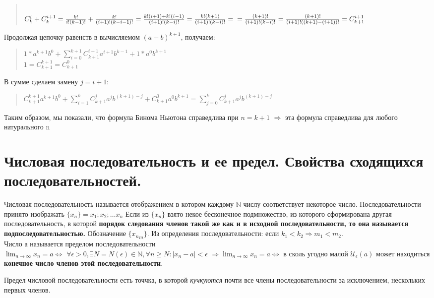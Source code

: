 \documentclass[oneside]{book}
\begin{document}
\begin{enumerate}
\begin{enumerate}
\begin{quote}
\\$C_k^i+C_k^{i+1}=\frac{k!}{i!(k-1)!}+\frac{k!}{(i+1)!(k-i-1)!}=\frac{k!(i+1)+k!(i-1)}{(i+1)!(k-i)!}=\frac{k!(k+1)}{(i+1)!(k-i)!}=\\=\frac{(k+1)!}{(i+1)!(k-i)!}=\frac{(k+1)!}{(i+1)!((k+1)-(i+1))!}=C_{k+1}^{i+1}$\end{quote}
Продолжая цепочку равенств в вычисляемом $(a+b)^{k+1}$, получаем:
\begin{quote}$1*a^{k+1}b^0+\sum\limits_{i=0}^{k+1}C_{k+1}^{i+1}a^{i+1}b^{k-1}+1*a^0b^{k+1}$\\
$1=C_{k+1}^{k+1}=C_{k+1}^0$\end{quote}
В сумме сделаем замену $j=i+1$:
\begin{quote}$C_{k+1}^{k+1}a^{k+1}b^0+\sum\limits_{i=1}^kC_{k+1}^ja^jb^{(k+1)-j}+C_{k+1}^0a^0b^{k+1}=\sum\limits_{j=0}^kC_{k+1}^j a^j b^{(k+1)-j}$
\end{quote}
Таким образом, мы показали, что формула Бинома Ньютона справедлива при $n=k+1$ $\Rightarrow$ эта формула справедлива для любого натурального n
\end{enumerate}
\setcounter{chapter}{4}
\chapter[Последовательности]{Числовая последовательность и ее предел. Свойства сходящихся последовательностей.}
Числовая последовательность называется отображением в котором каждому $\mathbb{N}$ числу соответствует
некоторое число. Последовательности принято изображать $\{x_n\} = x_1; x_2; \dots x_n$
Если из $\{x_n\}$ взято некое бесконечное подмножество, из которого сформирована другая последовательность,
в которой \textbf{порядок следования членов такой же как и в исходной последовательности, то она
	называется подпоследовательностью.} Обозначение $\{{x_n}_m\}$.
Из определения последовательности: если $k_1 < k_2 \Rightarrow m_1 < m_2$.\\
Число а называется пределом последовательности \\ $\lim_{n \rightarrow \infty}{x_n = a} \Leftrightarrow$
$\forall\epsilon>0,  \exists N=N(\epsilon) \in \mathbb{N}, \forall n \geq N: |x_n - a| < \epsilon$
$\Rightarrow \lim_{n \rightarrow \infty}{x_n = a} \Leftrightarrow$ в сколь угодно малой $\mathcal{U}_\epsilon(a)$
может находиться \textbf{конечное число членов этой последовательности}.

Предел числовой последовательности есть точчка, в которой \textit{кучкуются} почти все члены последовательности
за исключением, нескольких первых членов.


\end{enumerate}
\end{document}

